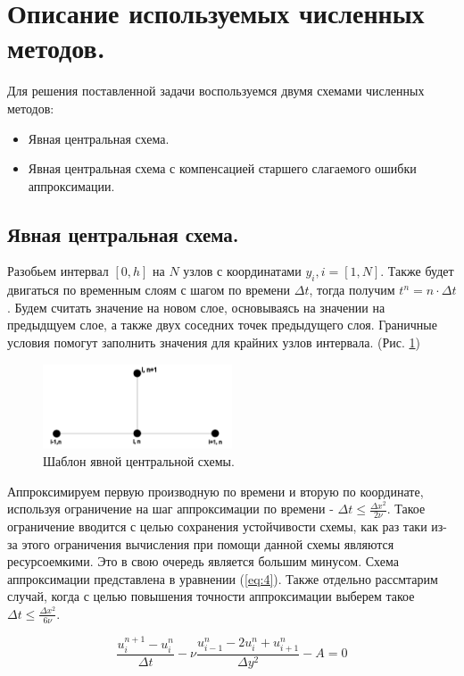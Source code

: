 \section{Описание используемых численных методов.}

Для решения поставленной задачи воспользуемся двумя схемами численных методов:
\begin{itemize}
    \item Явная центральная схема.
    \item Явная центральная схема с компенсацией старшего слагаемого ошибки аппроксимации.
\end{itemize}

\subsection{Явная центральная схема.}
Разобьем интервал $[0,h]$ на $N$ узлов с координатами $y_i, i=[1,N]$. Также будет двигаться по временным слоям с шагом по времени $\Delta t$, тогда получим $t^n = n \cdot \Delta t$. 
Будем считать значение на новом слое, основываясь на значении на предыдщуем слое, а также двух соседних точек предыдущего слоя. Граничные условия помогут заполнить значения для крайних узлов интервала. (Рис. \ref{fig:2})
\begin{figure}[H]
    \centering
    \includegraphics[width=0.5\textwidth]{images/2.png}
    \caption {Шаблон явной центральной схемы.}
    \label{fig:2}
\end{figure}

Аппроксимируем первую производную по времени и вторую по координате, используя ограничение на шаг аппроксимации по времени - $\Delta t \leq \frac{\Delta x^2}{2\nu}$. 
Такое ограничение вводится с целью сохранения устойчивости схемы, как раз таки из-за этого ограничения вычисления при помощи данной схемы являются ресурсоемкими. Это в свою очередь является большим минусом.
Схема аппроксимации представлена в уравнении (\ref{eq:4}).
Также отдельно рассмтарим случай, когда с целью повышения точности аппроксимации выберем такое $\Delta t \leq \frac{\Delta x^2}{6\nu}$.

\begin{equation}
    \frac{u^{n+1}_i-u^n_i}{\Delta t} - \nu \frac{u^n_{i-1}-2u^n_i+u^n_{i+1}}{\Delta y^2} - A =0
    \label{eq:4}
\end{equation}

